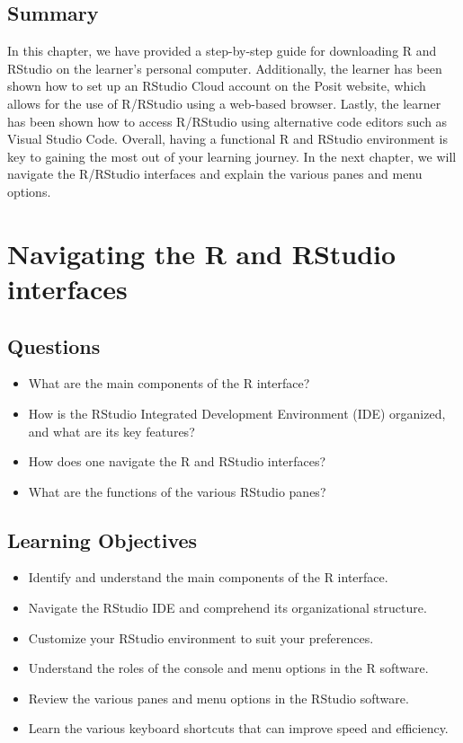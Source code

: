 \documentclass[
  letterpaper,
  DIV=11,
  numbers=noendperiod]{scrreprt}
\begin{document}
\section{Summary}\label{summary-1}

In this chapter, we have provided a step-by-step guide for downloading R
and RStudio on the learner's personal computer. Additionally, the
learner has been shown how to set up an RStudio Cloud account on the
Posit website, which allows for the use of R/RStudio using a web-based
browser. Lastly, the learner has been shown how to access R/RStudio
using alternative code editors such as Visual Studio Code. Overall,
having a functional R and RStudio environment is key to gaining the most
out of your learning journey. In the next chapter, we will navigate the
R/RStudio interfaces and explain the various panes and menu options.


\chapter{Navigating the R and RStudio interfaces}\label{sec-navigating}

\section{Questions}\label{questions-2}

\begin{itemize}
\item
  What are the main components of the R interface?
\item
  How is the RStudio Integrated Development Environment (IDE) organized,
  and what are its key features?
\item
  How does one navigate the R and RStudio interfaces?
\item
  What are the functions of the various RStudio panes?
\end{itemize}

\section{Learning Objectives}\label{learning-objectives-2}

\begin{itemize}
\item
  Identify and understand the main components of the R interface.
\item
  Navigate the RStudio IDE and comprehend its organizational structure.
\item
  Customize your RStudio environment to suit your preferences.
\item
  Understand the roles of the console and menu options in the R
  software.
\item
  Review the various panes and menu options in the RStudio software.
\item
  Learn the various keyboard shortcuts that can improve speed and
  efficiency.
\end{itemize}
\end{document}
